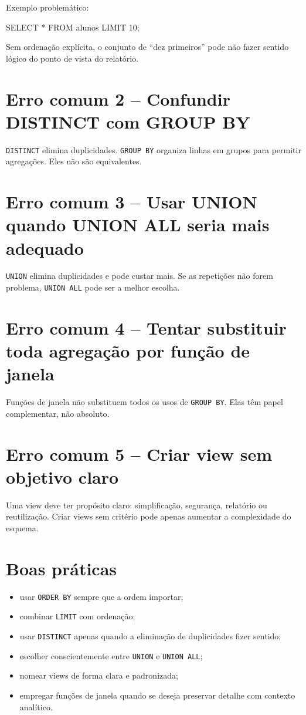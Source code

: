 Exemplo problemático:

\begin{sqlcode}
SELECT *
FROM alunos
LIMIT 10;
\end{sqlcode}

Sem ordenação explícita, o conjunto de “dez primeiros” pode não fazer sentido lógico do ponto de vista do relatório.

\section{Erro comum 2 -- Confundir DISTINCT com GROUP BY}

\texttt{DISTINCT} elimina duplicidades. \texttt{GROUP BY} organiza linhas em grupos para permitir agregações. Eles não são equivalentes.

\section{Erro comum 3 -- Usar UNION quando UNION ALL seria mais adequado}

\texttt{UNION} elimina duplicidades e pode custar mais. Se as repetições não forem problema, \texttt{UNION ALL} pode ser a melhor escolha.

\section{Erro comum 4 -- Tentar substituir toda agregação por função de janela}

Funções de janela não substituem todos os usos de \texttt{GROUP BY}. Elas têm papel complementar, não absoluto.

\section{Erro comum 5 -- Criar view sem objetivo claro}

Uma view deve ter propósito claro: simplificação, segurança, relatório ou reutilização. Criar views sem critério pode apenas aumentar a complexidade do esquema.

\section{Boas práticas}

\begin{itemize}
    \item usar \texttt{ORDER BY} sempre que a ordem importar;
    \item combinar \texttt{LIMIT} com ordenação;
    \item usar \texttt{DISTINCT} apenas quando a eliminação de duplicidades fizer sentido;
    \item escolher conscientemente entre \texttt{UNION} e \texttt{UNION ALL};
    \item nomear views de forma clara e padronizada;
    \item empregar funções de janela quando se deseja preservar detalhe com contexto analítico.
\end{itemize}

